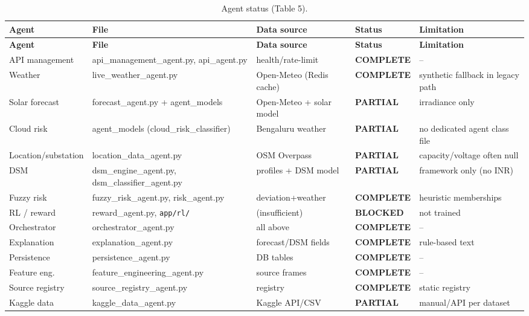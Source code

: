 \documentclass[11pt,a4paper]{article}
\newcommand{\stC}{\textcolor{cok}{\textbf{COMPLETE}}}
\newcommand{\stP}{\textcolor{cpart}{\textbf{PARTIAL}}}
\newcommand{\stB}{\textcolor{cmiss}{\textbf{BLOCKED}}}
\newcommand{\code}[1]{\texttt{\small #1}}
\begin{document}
\begin{footnotesize}
\begin{longtable}{@{}p{2.6cm}p{3.4cm}p{3.0cm}p{1.6cm}p{2.2cm}@{}}
\caption{Agent status (Table 5).}\label{tab:agents}\\
\toprule
\textbf{Agent} & \textbf{File} & \textbf{Data source} & \textbf{Status} & \textbf{Limitation}\\
\midrule
\endfirsthead
\toprule
\textbf{Agent} & \textbf{File} & \textbf{Data source} & \textbf{Status} & \textbf{Limitation}\\
\midrule
\endhead
\bottomrule
\endfoot
API management & api\_management\_agent.py, api\_agent.py & health/rate-limit & \stC & --\\
Weather & live\_weather\_agent.py & Open-Meteo (Redis cache) & \stC & synthetic fallback in legacy path\\
Solar forecast & forecast\_agent.py + agent\_models & Open-Meteo + solar model & \stP & irradiance only\\
Cloud risk & agent\_models (cloud\_risk\_classifier) & Bengaluru weather & \stP & no dedicated agent class file\\
Location/substation & location\_data\_agent.py & OSM Overpass & \stP & capacity/voltage often null\\
DSM & dsm\_engine\_agent.py, dsm\_classifier\_agent.py & profiles + DSM model & \stP & framework only (no INR)\\
Fuzzy risk & fuzzy\_risk\_agent.py, risk\_agent.py & deviation+weather & \stC & heuristic memberships\\
RL / reward & reward\_agent.py, \code{app/rl/} & (insufficient) & \stB & not trained\\
Orchestrator & orchestrator\_agent.py & all above & \stC & --\\
Explanation & explanation\_agent.py & forecast/DSM fields & \stC & rule-based text\\
Persistence & persistence\_agent.py & DB tables & \stC & --\\
Feature eng. & feature\_engineering\_agent.py & source frames & \stC & --\\
Source registry & source\_registry\_agent.py & registry & \stC & static registry\\
Kaggle data & kaggle\_data\_agent.py & Kaggle API/CSV & \stP & manual/API per dataset\\
\end{longtable}
\end{footnotesize}
\end{document}
